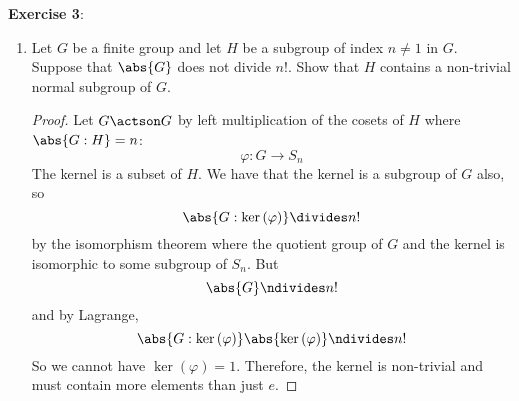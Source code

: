 \documentclass{article}
\begin{document}
\textbf{Exercise 3}:
\begin{enumerate}
	\item Let $G$ be a finite group and let $H$ be a subgroup of index $n \neq 1$ in $G$. Suppose that $\abs{G}$ does not divide $n!$. Show that $H$ contains a non-trivial normal subgroup of $G$.
		\begin{proof}
			Let $G \actson G$ by left multiplication of the cosets of $H$ where $\abs{G : H} = n$:
			\begin{equation*}
				\varphi: G \rightarrow S_{n}
			\end{equation*}
			The kernel is a subset of $H$. We have that the kernel is a subgroup of $G$ also, so
			\begin{equation*}
				\abs{G : \ker{(\varphi)}} \divides n!
			\end{equation*}
			by the isomorphism theorem where the quotient group of $G$ and the kernel is isomorphic to some subgroup of $S_{n}$. But
			\begin{equation*}
				\abs{G} \ndivides n!
			\end{equation*}
			and by Lagrange, 
			\begin{equation*}
				\abs{G : \ker{(\varphi)}}\abs{\ker{(\varphi)}} \ndivides n!
			\end{equation*}
			So we cannot have $\ker{(\varphi)} = 1$. Therefore, the kernel is non-trivial and must contain more elements than just $e$.
		\end{proof}


\end{enumerate}
\end{document}
